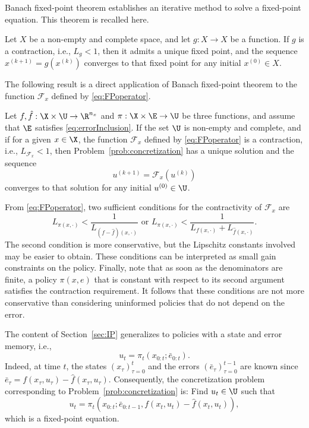 \documentclass[letterpaper, 10 pt, conference]{ieeeconf}  %
\begin{document}
Banach fixed-point theorem \cite{banach1922operations} establishes an iterative method to solve a fixed-point equation. This theorem is recalled here.

\begin{lemma}\label{thm:banach}
Let $X$ be a non-empty and complete space, and let $g:X\rightarrow X$ be a function. If $g$ is a contraction, i.e., $L_g<1$, then it admits a unique fixed point, and the sequence $x^{(k+1)}=g(x^{(k)})$ converges to that fixed point for any initial $x^{(0)}\in X$.
\end{lemma}

The following result is a direct application of Banach fixed-point theorem to the function $\mathcal{F}_x$ defined by \eqref{eq:FPoperator}.

\begin{theorem}\label{thm:concretization:nonlinear}
Let $f,\hat{f}:\X\times\U\rightarrow\R^{n_x}$ and $\pi:\X\times\E\rightarrow\U$ be three functions, and assume that $\E$ satisfies \eqref{eq:errorInclusion}. If the set $\U$ is non-empty and complete, and if for a given $x\in\X$, the function $\mathcal{F}_x$ defined by \eqref{eq:FPoperator} is a contraction, i.e., $L_{\mathcal{F}_x}<1$, then Problem~\ref{prob:concretization} has a unique solution and the sequence
$$
u^{(k+1)}=\mathcal{F}_x(u^{(k)})
$$
converges to that solution for any initial $u^{(0)}\in\U$.
\end{theorem}

From \eqref{eq:FPoperator}, two sufficient conditions for the contractivity of $\mathcal{F}_x$ are
\begin{equation}\label{eq:lipschitz}
L_{\pi(x,\cdot)}<\dfrac{1}{L_{(f-\hat{f})(x,\cdot)}} \text{ or } L_{\pi(x,\cdot)}<\dfrac{1}{L_{f(x,\cdot)}+L_{\hat{f}(x,\cdot)}}.
\end{equation}
The second condition is more conservative, but the Lipschitz constants involved may be easier to obtain. These conditions can be interpreted as small gain constraints on the policy. Finally, note that as soon as the denominators are finite, a policy $\pi(x,e)$ that is constant with respect to its second argument satisfies the contraction requirement. It follows that these conditions are not more conservative than considering uninformed policies that do not depend on the error.

\begin{remark}\label{rem:memory}
The content of Section~\ref{sec:IP} generalizes to policies with a state and error memory, i.e.,
$$
u_t=\pi_t(x_{0:t};\bar{e}_{0:t}).
$$
Indeed, at time $t$, the states $(x_\tau)_{\tau=0}^t$ and the errors $(\bar{e}_\tau)_{\tau=0}^{t-1}$ are known since $\bar{e}_\tau=f(x_\tau,u_\tau)-\hat{f}(x_\tau,u_\tau)$. Consequently, the concretization problem corresponding to Problem~\ref{prob:concretization} is: Find $u_t\in\U$ such that
$$
u_t=\pi_t(x_{0:t};\bar{e}_{0:t-1},f(x_t,u_t)-\hat{f}(x_t,u_t)),
$$
which is a fixed-point equation.
\end{remark}
\end{document}
